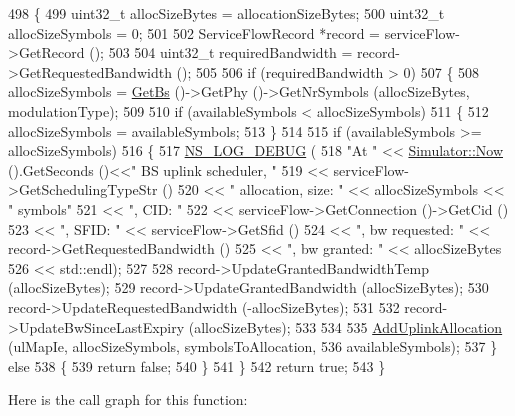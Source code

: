 \begin{DoxyCode}
498 \{
499   uint32\_t allocSizeBytes = allocationSizeBytes;
500   uint32\_t allocSizeSymbols = 0;
501 
502   ServiceFlowRecord *record = serviceFlow->GetRecord ();
503 
504   uint32\_t requiredBandwidth = record->GetRequestedBandwidth ();
505 
506   \textcolor{keywordflow}{if} (requiredBandwidth > 0)
507     \{
508       allocSizeSymbols = \hyperlink{classns3_1_1UplinkScheduler_afe61b7de71d92d2dff1b135744a6ff7e}{GetBs} ()->GetPhy ()->GetNrSymbols (allocSizeBytes, modulationType);
509 
510       \textcolor{keywordflow}{if} (availableSymbols < allocSizeSymbols)
511         \{
512           allocSizeSymbols = availableSymbols;
513         \}
514 
515       \textcolor{keywordflow}{if} (availableSymbols >= allocSizeSymbols)
516         \{
517           \hyperlink{group__logging_ga413f1886406d49f59a6a0a89b77b4d0a}{NS\_LOG\_DEBUG} (
518             \textcolor{stringliteral}{"At "} << \hyperlink{classns3_1_1Simulator_ac3178fa975b419f7875e7105be122800}{Simulator::Now} ().GetSeconds ()<<\textcolor{stringliteral}{" BS uplink scheduler, "}
519                   << serviceFlow->GetSchedulingTypeStr ()
520                   << \textcolor{stringliteral}{" allocation, size: "} << allocSizeSymbols << \textcolor{stringliteral}{" symbols"}
521                   << \textcolor{stringliteral}{", CID: "}
522                   << serviceFlow->GetConnection ()->GetCid ()
523                   << \textcolor{stringliteral}{", SFID: "} << serviceFlow->GetSfid ()
524                   << \textcolor{stringliteral}{", bw requested: "} << record->GetRequestedBandwidth ()
525                   << \textcolor{stringliteral}{", bw granted: "} << allocSizeBytes
526                   << std::endl);
527 
528           record->UpdateGrantedBandwidthTemp (allocSizeBytes);
529           record->UpdateGrantedBandwidth (allocSizeBytes);
530           record->UpdateRequestedBandwidth (-allocSizeBytes);
531 
532           record->UpdateBwSinceLastExpiry (allocSizeBytes);
533 
534 
535           \hyperlink{classns3_1_1UplinkSchedulerMBQoS_a23b74ad65ec3d22b55d25648addd7486}{AddUplinkAllocation} (ulMapIe, allocSizeSymbols, symbolsToAllocation,
536                                availableSymbols);
537         \} \textcolor{keywordflow}{else}
538         \{
539           \textcolor{keywordflow}{return} \textcolor{keyword}{false};
540         \}
541     \}
542   \textcolor{keywordflow}{return} \textcolor{keyword}{true};
543 \}
\end{DoxyCode}


Here is the call graph for this function\+:




